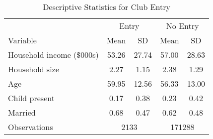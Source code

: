 \begin{table}[!htbp] \centering
\caption{Descriptive Statistics for Club Entry}
\label{tab:costcoSummaryStats}
\begin{tabular}{@{\extracolsep{4pt}}lcccc}
\hline
 & \multicolumn{2}{c}{Entry} & \multicolumn{2}{c}{No Entry} \\
\cline{2-3} \cline{4-5}
Variable                  & Mean  & SD    & Mean  & SD    \\
\hline
Household income (\$000s) & 53.26 & 27.74 & 57.00 & 28.63  \\
Household size            & 2.27  & 1.15  & 2.38  & 1.29   \\
Age                       & 59.95 & 12.56 & 56.33 & 13.00  \\
Child present             & 0.17  & 0.38  & 0.23  & 0.42   \\
Married                   & 0.68  & 0.47  & 0.62  & 0.48   \\
\hline
Observations  & \multicolumn{2}{c}{2133} & \multicolumn{2}{c}{171288}  \\
\hline
\hline
\end{tabular}
\end{table}
